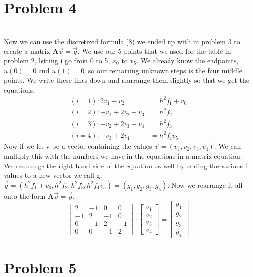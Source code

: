 \documentclass[english,notitlepage]{revtex4-1}  %
\begin{document}
 \section*{Problem 4}\
 \\
Now we can use the discretized formula (8) we ended up with in problem 3 to create a matrix $\mathbf{A}\vec{v} = \vec{g}$. We use our 5 points that we used for the table in problem 2, letting i go from 0 to 5, $x_0$ to $x_5$. We already know the endpoints, $u(0) = 0$ and $u(1) = 0$, so our remaining unknown steps is the four middle points. We write these lines down and rearrange them slightly so that we get the equations,
 \begin{align*}
( i = 1): 2v_1 - v_2 &= h^2 f_1 + v_0\\
( i = 2): -v_1 + 2v_2 - v_3 &= h^2 f_2 \\
( i = 3): -v_2 + 2v_3 - v_4 &= h^2 f_3\\
( i = 4): -v_3 + 2v_4 &= h^2 f_4 v_5
 \end{align*}
Now if we let v be a vector containing the values $\vec{v} = (v_1, v_2, v_3, v_4)$. We can multiply this with the numbers we have in the equations in a matrix equation. We rearrange the right hand side of the equation as well by adding the various f values to a new vector we call g, $\vec{g} = (h^2 f_1 + v_0, h^2 f_2, h^2 f_3, h^2 f_4 v_5) = (g_1, g_2, g_3, g_4)$. Now we rearrange it all onto the form $\mathbf{A}\vec{v} = \vec{g}$.
\begin{equation}
\begin{bmatrix}
2 & -1 & 0 & 0 \\
-1 & 2 & -1 & 0 \\
0 & -1 & 2 & -1 \\
0 & 0 & -1 & 2
\end{bmatrix}
\cdot
\begin{bmatrix}
v_1 \\
v_2 \\
v_3 \\
v_4
\end{bmatrix}
=
\begin{bmatrix}
g_1 \\
g_2 \\
g_3 \\
g_4
\end{bmatrix}
\end{equation}


 \section*{Problem 5}
\end{document}

